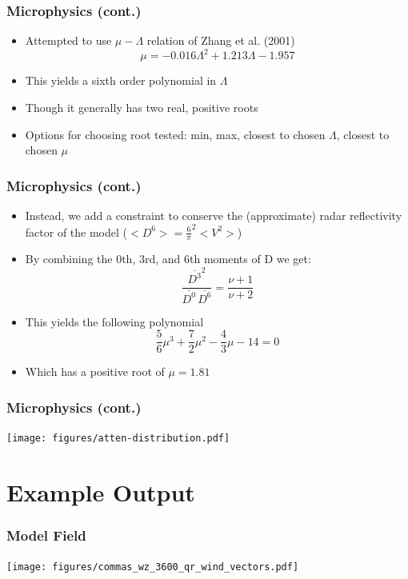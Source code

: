 \documentclass[red]{beamer}
\begin{document}
\begin{frame}[<+->]
	\frametitle{Microphysics (cont.)}
	\begin{itemize}
		\item Attempted to use $\mu-\Lambda$ relation of Zhang et al. (2001)
		\begin{equation}
			\mu = \num{-0.016} \Lambda^2 + \num{1.213} \Lambda - \num{1.957}
		\end{equation}
		\item This yields a sixth order polynomial in $\Lambda$
		\item Though it generally has two real, positive roots
		\item Options for choosing root tested: min, max, closest to chosen $\Lambda$, closest to chosen $\mu$
	\end{itemize}
\end{frame}

\begin{frame}[<+->]
	\frametitle{Microphysics (cont.)}
	\begin{itemize}
		\item Instead, we add a constraint to conserve the (approximate) radar reflectivity factor of the model ($<D^6> = \frac{6}{\pi}^2<V^2>$)
		\item By combining the 0th, 3rd, and 6th moments of D we get:
		\begin{equation}
			\frac{\overline{D^3}^2}{\overline{D^0}\,\overline{D^6}} =  \frac{\nu + 1}{\nu + 2}
		\end{equation}
		\item This yields the following polynomial
		\begin{equation}
			\frac{\num{5}}{\num{6}} \mu^3 + \frac{\num{7}}{\num{2}} \mu^2 - \frac{\num{4}}{\num{3}} \mu - \num{14} = 0
		\end{equation}
		\item Which has a positive root of $\mu=\num{1.81}$
	\end{itemize}
\end{frame}

\begin{frame}
	\frametitle{Microphysics (cont.)}
	\begin{center}
		\texttt{[image: figures/atten-distribution.pdf]}
	\end{center}
\end{frame}

\section{Example Output}
\begin{frame}
	\frametitle{Model Field}
	\begin{center}
		\texttt{[image: figures/commas\_wz\_3600\_qr\_wind\_vectors.pdf]}	
	\end{center}
\end{frame}
\end{document}
